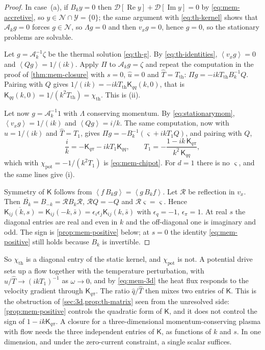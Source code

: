 \documentclass[11pt]{article}
\newcommand{\av}[1]{\left\langle #1\right\rangle}
\newcommand{\D}{\mathcal D}
\newcommand{\A}{\mathcal A}
\newcommand{\Real}{\operatorname{Re}}
\newcommand{\Imag}{\operatorname{Im}}
\newcommand{\N}{\mathcal N}
\newcommand{\thr}{\mathrm{th}}
\newcommand{\pot}{\mathrm{pot}}
\theoremstyle{definition}
\theoremstyle{remark}
\numberwithin{equation}{section}
\begin{document}
\begin{proof}
In case~(a), if $B_ky=0$ then $\D[\Real y]+\D[\Imag y]=0$ by
\eqref{eq:mem-accretive}, so $y\in\N\cap\mathcal Y=\{0\}$; the same
argument with \eqref{eq:th-kernel} shows that $\A_kg=0$ forces
$g\in\N$, so $\Lambda g=0$ and then $v_xg=0$, hence $g=0$, so the stationary
problems are solvable.

Let $g=\A_k^{-1}\zeta$ be the thermal solution \eqref{eq:th-g}. By
\eqref{eq:th-identities}, $\av{v_xg}=0$ and $\av{Qg}=1/(ik)$. Apply $\Pi$
to $\A_kg=\zeta$ and repeat the computation in the proof of
\cref{thm:mem-closure} with $s=0$, $\widehat u=0$ and
$\widehat T=T_\thr$: $\Pi g=-ikT_\thr B_k^{-1}Q$. Pairing with $Q$ gives
$1/(ik)=-ikT_\thr\mathsf K_{qq}(k,0)$, that is
$\mathsf K_{qq}(k,0)=1/(k^2T_\thr)=\chi_\thr$. This is (ii).

Let now $g=\A_k^{-1}1$ with $\Lambda$ conserving momentum. By
\eqref{eq:stationarymom}, $\av{v_xg}=1/(ik)$ and $\av{Qg}=i/k$. The same
computation, now with $\widehat u=1/(ik)$ and $\widehat T=T_1$, gives
$\Pi g=-B_k^{-1}(\varsigma+ikT_1Q)$, and pairing with $Q$,
\[
 \frac ik=-\mathsf K_{q\pi}-ikT_1\mathsf K_{qq},
 \qquad
 T_1=-\frac{1-ik\,\mathsf K_{q\pi}}{k^2\,\mathsf K_{qq}} ,
\]
which with $\chi_\pot=-1/(k^2T_1)$ is \eqref{eq:mem-chipot}. For $d=1$
there is no $\varsigma$, and the same lines give (i).

Symmetry of $\mathsf K$ follows from $\av{f\,B_kg}=\av{g\,B_kf}$. Let
$\mathcal R$ be reflection in $v_x$. Then
$\overline{B_k}=B_{-k}=\mathcal RB_k\mathcal R$, $\mathcal RQ=-Q$ and
$\mathcal R\varsigma=\varsigma$. Hence
$\overline{\mathsf K_{ij}(k,s)}=\mathsf K_{ij}(-k,\bar s)
 =\epsilon_i\epsilon_j\mathsf K_{ij}(k,\bar s)$ with
$\epsilon_q=-1$, $\epsilon_\pi=1$. At real $s$ the diagonal entries are
real and even in $k$ and the off-diagonal one is imaginary and odd.
The sign is \cref{prop:mem-positive} below; at $s=0$ the identity
\eqref{eq:mem-positive} still holds because $B_k$ is invertible.
\end{proof}

So $\chi_\thr$ is a diagonal entry of the static kernel, and $\chi_\pot$
is not. A potential drive sets up a flow together with the temperature
perturbation, with $\widehat u/\widehat T\to(ikT_1)^{-1}$ as
$\omega\to0$, and by \eqref{eq:mem-3d} the heat flux responds to the
velocity gradient through $\mathsf K_{q\pi}$. The ratio
$\widehat q/\widehat T$ then mixes two entries of $\mathsf K$. This is
the obstruction of \cref{sec:3d,prop:th-matrix} seen from the unresolved
side: \cref{prop:mem-positive} controls the quadratic form of
$\mathsf K$, and it does not control the sign of
$1-ik\mathsf K_{q\pi}$. A closure for a three-dimensional
momentum-conserving plasma with flow needs the three independent entries of $\mathsf K$, as functions of $k$ and
$s$. In one dimension, and under the zero-current constraint, a single
scalar suffices.
\end{document}
